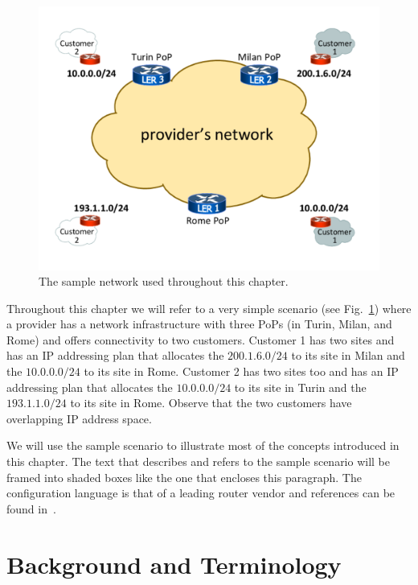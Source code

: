 \documentclass{article}
\begin{document}
\begin{figure}
\centering
 \includegraphics[trim=0cm 1.5cm 0cm 1.5cm, clip=true, width=0.7\columnwidth]{figures/mpls-slides-0}
 \caption{The sample network used throughout this chapter.}
 \label{fig:mpls-slides-0}
\end{figure}


\begin{shaded}
\noindent
Throughout this chapter we will refer to a very simple scenario (see
Fig.~\ref{fig:mpls-slides-0}) where a provider has a network infrastructure with three
PoPs (in Turin, Milan, and Rome) and offers connectivity to two customers. Customer 1 has
two sites and has an IP addressing plan that allocates the $200.1.6.0/24$ to its site
in Milan and the $10.0.0.0/24$ to its site in Rome. Customer 2 has two sites too
and has an IP addressing plan that allocates the $10.0.0.0/24$ to its site in Turin
and the $193.1.1.0/24$ to its site in Rome. Observe that the two customers have overlapping IP address space.

We will use the sample scenario to illustrate most of the concepts introduced in 
this chapter. The text that describes and refers to the sample scenario will be 
framed into shaded boxes like the one that encloses this paragraph. The configuration
language is that of a leading router vendor and references can be found
in~\cite{de-ghein}.
\end{shaded}
\section{Background and Terminology}\label{se:background}
\end{document}
